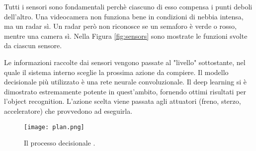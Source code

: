 Tutti i sensori sono fondamentali perchè ciascuno di esso compensa i punti deboli dell'altro. Una videocamera non funziona bene in condizioni di nebbia intensa, ma un radar sì. Un radar però non riconosce se
un semaforo è verde o rosso, mentre una camera sì. Nella Figura \ref{fig:sensors} sono mostrate le funzioni svolte da ciascun sensore.


Le informazioni raccolte dai sensori vengono passate al "livello" sottostante, nel quale il sistema interno sceglie la prossima azione da compiere.
Il modello decisionale più utilizzato è una rete neurale convoluzionale. Il deep learning si è dimostrato estremamente potente in quest'ambito, fornendo
ottimi risultati per l'object recognition. L'azione scelta viene passata agli attuatori (freno, sterzo, acceleratore) che provvedono ad eseguirla.
\begin{figure}[h]
    \texttt{[image: plan.png]}
    \caption{Il processo decisionale \cite{giacaglia}.}
    \label{fig:giacaglia}
\end{figure}